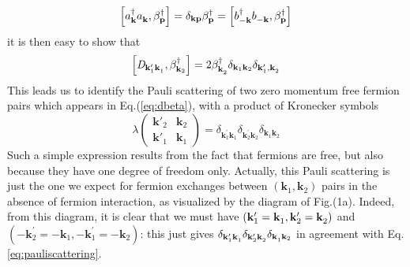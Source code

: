 \documentclass[aps,prb,superscriptaddress,showpacs,reprint,lengthcheck]{revtex4-1}
\newcommand{\vk}{\ensuremath{\mathbf{k}}}
\begin{document}
\begin{equation}  \label{eq:aBeta}
\left[a^{\dagger}_{\mathbf{k} }a^{}_{\mathbf{k} },\beta^{\dagger}_{\mathbf{p}
}\right]  =\delta_{\mathbf{k} \mathbf{p} }\beta^{\dagger}_{\mathbf{p} }=%
\left[b^{\dagger}_{-\mathbf{k} }b^{}_{-\mathbf{k} },\beta^{\dagger}_{\mathbf{%
p} }\right]  
\end{equation}
it is then easy to show that 
\begin{equation}  \label{eq:Dcom}
\left[\mathit{D} _{\mathbf{k} ^{\prime}_1\mathbf{k} ^{}_1},\beta^{\dagger}_{%
\mathbf{k} _2}\right]  =2\beta^{\dagger}_{\mathbf{k} ^{}_2}\delta_{\mathbf{k} _1%
\mathbf{k} _2}\delta_{\mathbf{k} ^{\prime}_1,\mathbf{k} ^{}_2}
\end{equation}
This leads us to identify the Pauli scattering of two zero momentum free fermion pairs which appears in Eq.(\ref{eq:dbeta}), with a
product of Kronecker symbols 
\begin{equation}  \label{eq:pauliscattering}
\lambda\left(\begin{smallmatrix}\vk'_2&\vk_2\\\vk'_1&\vk_1\end{smallmatrix}%
\right)  =\delta_{\mathbf{k} ^{\prime}_1\mathbf{k} ^{}_1}\delta_{\mathbf{k}
^{\prime}_2\mathbf{k} ^{}_2}\delta_{\mathbf{k} ^{}_1\mathbf{k} ^{}_2}
\end{equation}
Such a simple expression results from the fact that fermions are free, but also because they have one degree of freedom only.
Actually, this Pauli scattering is just the one we expect for fermion exchanges between $\left(\mathbf{k} _1,\mathbf{k} _2\right) $ pairs in the absence of fermion interaction,
as visualized by the diagram of Fig.(1a). Indeed, from this
diagram, it is clear that we must have $\left(\mathbf{k} ^{\prime}_1=\mathbf{%
k} ^{}_1,\mathbf{k} ^{\prime}_2=\mathbf{k} ^{}_2\right) $ and $\left(-\mathbf{k}
^{\prime}_2=-\mathbf{k} ^{}_1,-\mathbf{k} ^{\prime}_1=-\mathbf{k} ^{}_2\right) $:
this just gives $\delta_{\mathbf{k} ^{\prime}_1\mathbf{k} ^{}_1}\delta_{\mathbf{%
k} ^{\prime}_2\mathbf{k} ^{}_2}\delta_{\mathbf{k} ^{}_1\mathbf{k} _2}$ in
agreement with Eq.\eqref{eq:pauliscattering}.
\end{document}
